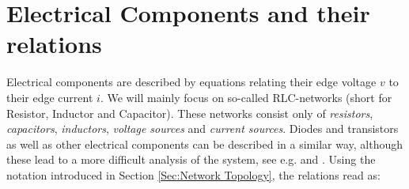 \section{Electrical Components and their relations}
\label{Sec:Components relations}
Electrical components are described by equations relating their edge voltage $v$ to their edge current $i$. We will mainly focus on so-called RLC-networks (short for Resistor, Inductor and Capacitor). These networks consist only of \emph{resistors}, \emph{capacitors}, \emph{inductors}, \emph{voltage sources} and \emph{current sources}. Diodes and transistors as well as other electrical components can be described in a similar way, although these lead to a more difficult analysis of the system, see e.g. \cite{ModellingAndDiscretizationOfCircuitProblems} and \cite{SchwarzTischendorfCircuitMNA}. Using the notation introduced in Section \ref{Sec:Network Topology}, the relations read as:
